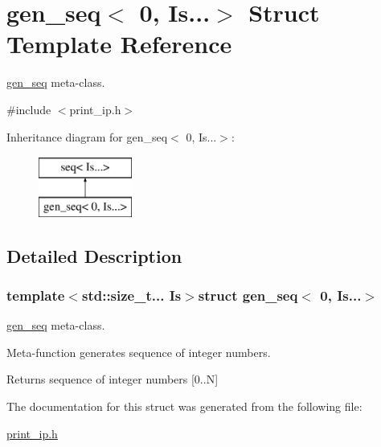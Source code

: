 \hypertarget{structgen__seq_3_010_00_01Is_8_8_8_4}{\section{gen\-\_\-seq$<$ 0, Is...$>$ Struct Template Reference}
\label{structgen__seq_3_010_00_01Is_8_8_8_4}
}


\hyperlink{structgen__seq}{gen\-\_\-seq} meta-\/class.  




{\ttfamily \#include $<$print\-\_\-ip.\-h$>$}

Inheritance diagram for gen\-\_\-seq$<$ 0, Is...$>$\-:\begin{figure}[H]
\begin{center}
\leavevmode
\includegraphics[height=2.000000cm]{structgen__seq_3_010_00_01Is_8_8_8_4}
\end{center}
\end{figure}


\subsection{Detailed Description}
\subsubsection*{template$<$std\-::size\-\_\-t... Is$>$struct gen\-\_\-seq$<$ 0, Is...$>$}

\hyperlink{structgen__seq}{gen\-\_\-seq} meta-\/class. 

Meta-\/function generates sequence of integer numbers. \begin{DoxyReturn}{Returns}
sequence of integer numbers \mbox{[}0..N\mbox{]} 
\end{DoxyReturn}


The documentation for this struct was generated from the following file\-:\begin{DoxyCompactItemize}
\item 
\hyperlink{print__ip_8h}{print\-\_\-ip.\-h}\end{DoxyCompactItemize}
